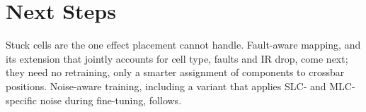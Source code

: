 \documentclass[10pt,a4paper]{article}
\begin{document}
\section{Next Steps}
Stuck cells are the one effect placement cannot handle. Fault-aware mapping, and its extension that
jointly accounts for cell type, faults and IR drop, come next; they need no retraining, only a smarter
assignment of components to crossbar positions. Noise-aware training, including a variant that applies
SLC- and MLC-specific noise during fine-tuning, follows.

\vspace{6pt}


\end{document}

